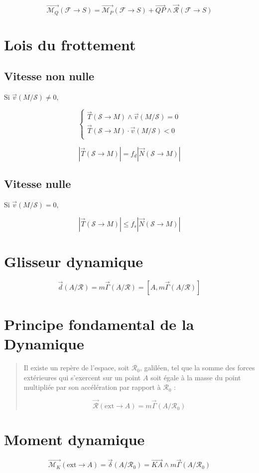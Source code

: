 \documentclass[a4paper, 11pt]{article}
\newcommand{\V}{\overrightarrow}
\newcommand{\R}{\mathcal{R}}
\newcommand{\F}{\mathcal{F}}
\newcommand{\M}{\mathcal{M}}
\newcommand{\s}{\mathcal{S}}
\begin{document}
$$\V{\M_Q}(\F\rightarrow S) = \V{\M_P}(\F\rightarrow S) + \V{QP}\wedge\V{\R}(\F\rightarrow S)$$


\section{Lois du frottement}

\subsection{Vitesse non nulle}

Si $\V{v}(M/\s) \not= 0$,

$$\left\{
\begin{array}{l}
    \V{T}(\s \rightarrow M) \wedge \V{v}(M/\s) = 0\\
    \V{T}(\s \rightarrow M) \cdot \V{v}(M/\s) < 0\\
\end{array}
\right.$$

$$\left|\V{T}(\s\rightarrow M)\right| = f_d\left|\V{N}(\s\rightarrow M)\right|$$


\subsection{Vitesse nulle}

Si $\V{v}(M/\s) = 0$,

$$\left|\V{T}(\s\rightarrow M)\right| \leq f_s\left|\V{N}(\s\rightarrow M)\right|$$

\section{Glisseur dynamique}

$$\V{d}(A/\R) = m\V{\Gamma}(A/\R) = \left[A, m\V{\Gamma}(A/\R)\right]$$

\section{Principe fondamental de la Dynamique}

\begin{quote}
    Il existe un repère de l'espace, soit $\R_0$, galiléen, tel que la somme des forces extérieures qui s'exercent sur
    un point $A$ soit égale à la masse du point multipliée par son accélération par rapport à $\R_0$ :

    $$\V{\R}(\mathrm{ext}\rightarrow A) = m\V{\Gamma}(A/\R_0)$$

\end{quote}

\section{Moment dynamique}

$$\V{\M_K}(\mathrm{ext}\rightarrow A) = \V{\delta}(A/\R_0) = \V{KA}\wedge m\V{\Gamma}(A/\R_0)$$
\end{document}
